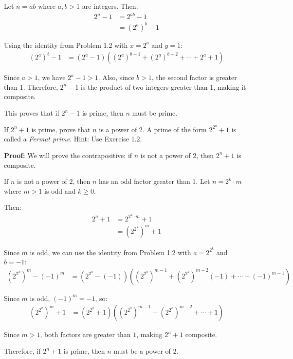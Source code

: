 Let $n = ab$ where $a, b > 1$ are integers. Then:
\begin{align*}
2^n - 1 &= 2^{ab} - 1 \\
&= (2^a)^b - 1
\end{align*}

Using the identity from Problem 1.2 with $x = 2^a$ and $y = 1$:
\begin{align*}
(2^a)^b - 1 &= (2^a - 1)((2^a)^{b-1} + (2^a)^{b-2} + \cdots + 2^a + 1)
\end{align*}

Since $a > 1$, we have $2^a - 1 > 1$. Also, since $b > 1$, the second factor is greater than 1. Therefore, $2^n - 1$ is the product of two integers greater than 1, making it composite.

This proves that if $2^n - 1$ is prime, then $n$ must be prime.

\begin{problembox}
If $2^n + 1$ is prime, prove that $n$ is a power of $2$. A prime of the form $2^{2^n} + 1$ is called a \textit{Fermat prime}. Hint: Use Exercise 1.2.
\end{problembox}

\textbf{Proof:}
We will prove the contrapositive: if $n$ is not a power of $2$, then $2^n + 1$ is composite.

If $n$ is not a power of $2$, then $n$ has an odd factor greater than $1$. Let $n = 2^k \cdot m$ where $m > 1$ is odd and $k \geq 0$.

Then:
\begin{align*}
2^n + 1 &= 2^{2^k \cdot m} + 1 \\
&= (2^{2^k})^m + 1
\end{align*}

Since $m$ is odd, we can use the identity from Problem 1.2 with $a = 2^{2^k}$ and $b = -1$:
\begin{align*}
(2^{2^k})^m - (-1)^m &= (2^{2^k} - (-1))((2^{2^k})^{m-1} + (2^{2^k})^{m-2}(-1) + \cdots + (-1)^{m-1})
\end{align*}

Since $m$ is odd, $(-1)^m = -1$, so:
\begin{align*}
(2^{2^k})^m + 1 &= (2^{2^k} + 1)((2^{2^k})^{m-1} - (2^{2^k})^{m-2} + \cdots + 1)
\end{align*}

Since $m > 1$, both factors are greater than $1$, making $2^n + 1$ composite.

Therefore, if $2^n + 1$ is prime, then $n$ must be a power of $2$.

